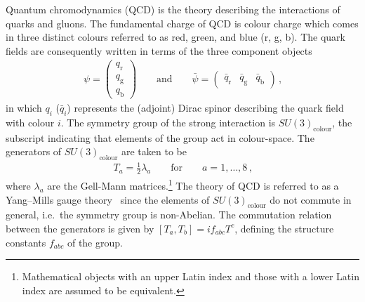 Quantum chromodynamics (QCD) is the theory describing the interactions of quarks
and gluons. The fundamental charge of QCD is colour charge which comes in three
distinct colours referred to as red, green, and blue (r, g, b). The quark fields
are consequently written in terms of the three component objects
\begin{align*}
  \psi =
  \begin{pmatrix}
    q_\text{r} \\
    q_\text{g} \\
    q_\text{b}
  \end{pmatrix}
  \qquad
  \text{and}
  \qquad
  \bar{\psi} =
  \begin{pmatrix}
    \bar{q}_\text{r} & \bar{q}_\text{g} & \bar{q}_\text{b}
  \end{pmatrix} \,\text{,}
\end{align*}
in which $q_i$ ($\bar{q}_i$) represents the (adjoint) Dirac spinor describing
the quark field with colour $i$. The symmetry group of the strong interaction is
$SU(3)_{\text{colour}}$, the subscript indicating that elements of the group act
in colour-space. The generators of $SU(3)_{\text{colour}}$ are taken to be
\begin{align*}
  T_a = \frac{1}{2} \lambda_a \qquad \text{for} \qquad a = 1, \dots, 8 \,\text{,}
\end{align*}
where $\lambda_a$ are the Gell-Mann matrices.\footnote{Mathematical objects with
  an upper Latin index and those with a lower Latin index are assumed to be
  equivalent.} The theory of QCD is referred to as a Yang--Mills gauge
theory~\cite{Yang:1954ek} since the elements of $SU(3)_{\text{colour}}$ do not
commute in general, i.e.\ the symmetry group is non-Abelian. The commutation
relation between the generators is given by $[T_a, T_b] = i f_{abc} T^c$,
defining the structure constants $f_{abc}$ of the group.

